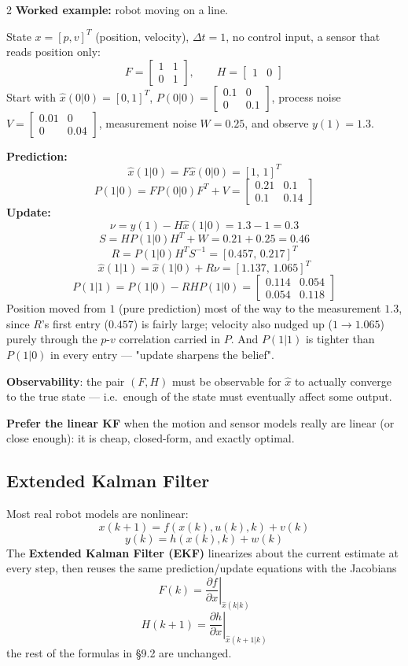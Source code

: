 \documentclass[10pt,a4paper]{article}
\newcommand{\keyterm}[1]{\textbf{#1}}
\begin{document}
\begin{multicols}{2}
\keyterm{Worked example:} robot moving on a line. 

State $x=[p,v]^T$ (position, velocity), $\Delta t=1$, no control input, a sensor that reads position only:
\[
F=\begin{bmatrix}1&1\\0&1\end{bmatrix},\qquad H=\begin{bmatrix}1&0\end{bmatrix}
\]
Start with $\hat x(0|0)=[0,1]^T$, $P(0|0)=\begin{bmatrix}0.1&0\\0&0.1\end{bmatrix}$, process noise $V=\begin{bmatrix}0.01&0\\0&0.04\end{bmatrix}$, measurement noise $W=0.25$, and observe $y(1)=1.3$.

\textbf{Prediction:}
\[
\hat x(1|0)=F\hat x(0|0)=[1,\,1]^T
\]
\[
P(1|0)=FP(0|0)F^T+V=\begin{bmatrix}0.21&0.1\\0.1&0.14\end{bmatrix}
\]
\textbf{Update:}
\[
\nu=y(1)-H\hat x(1|0)=1.3-1=0.3
\]
\[
S=HP(1|0)H^T+W=0.21+0.25=0.46
\]
\[
R=P(1|0)H^TS^{-1}=[0.457,\,0.217]^T
\]
\[
\hat x(1|1)=\hat x(1|0)+R\nu=[1.137,\,1.065]^T
\]
\[
P(1|1)=P(1|0)-RHP(1|0)=\begin{bmatrix}0.114&0.054\\0.054&0.118\end{bmatrix}
\]
Position moved from $1$ (pure prediction) most of the way to the measurement $1.3$, since $R$'s first entry ($0.457$) is fairly large; velocity also nudged up ($1\to1.065$) purely through the $p$-$v$ correlation carried in $P$. And $P(1|1)$ is tighter than $P(1|0)$ in every entry --- "update sharpens the belief".

\keyterm{Observability}: the pair $(F,H)$ must be observable for $\hat x$ to actually converge to the true state --- i.e.\ enough of the state must eventually affect some output. 

\keyterm{Prefer the linear KF} when the motion and sensor models really are linear (or close enough): it is cheap, closed-form, and exactly optimal.

\subsection{Extended Kalman Filter}
Most real robot models are nonlinear: 
\[
x(k{+}1)=f(x(k),u(k),k)+v(k)
\]
\[
y(k)=h(x(k),k)+w(k)
\]
The \keyterm{Extended Kalman Filter (EKF)} linearizes about the current estimate at every step, then reuses the same prediction/update equations with the Jacobians
\[
F(k)=\left.\frac{\partial f}{\partial x}\right|_{\hat x(k|k)}
\]
\[
H(k{+}1)=\left.\frac{\partial h}{\partial x}\right|_{\hat x(k{+}1|k)}
\]
the rest of the formulas in \S9.2 are unchanged. 


\end{multicols}
\end{document}
